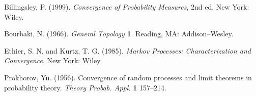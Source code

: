 \documentclass[bj,authoryear]{imsart}
\theoremstyle{plain}
\theoremstyle{definition}
\begin{document}

\begin{thebibliography}{4}

Billingsley, P. (1999). \textit{Convergence of
Probability Measures}, 2nd ed.
New York: Wiley.

Bourbaki, N.  (1966). \textit{General Topology}  \textbf{1}.
Reading, MA: Addison--Wesley.

Ethier, S. N. and Kurtz, T. G. (1985).
\textit{Markov Processes: Characterization and Convergence}.
New York: Wiley.

Prokhorov, Yu. (1956).
Convergence of random processes and limit theorems in probability
theory. \textit{Theory  Probab.  Appl.}
\textbf{1} 157--214.

\end{thebibliography}
\end{document}
